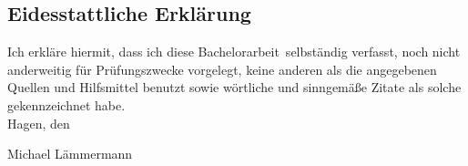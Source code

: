 \documentclass[twoside,bibliography=totoc,openany]{fumi}
\newcommand{\thesisauthor}{Michael Lämmermann}
\newcommand{\thesistype}{Bachelorarbeit} %
\begin{document}
\subsection*{Eidesstattliche Erklärung}
Ich erkläre hiermit, dass ich diese \thesistype~selbständig verfasst, noch nicht anderweitig für Prüfungszwecke vorgelegt, keine anderen als die angegebenen Quellen und Hilfsmittel benutzt sowie wörtliche und sinngemäße Zitate als solche gekennzeichnet habe.\\[1cm]
Hagen, den \dotfill

\hspace{2cm}{\footnotesize Datum}\hspace{5cm} {\footnotesize \thesisauthor}
\end{document}
